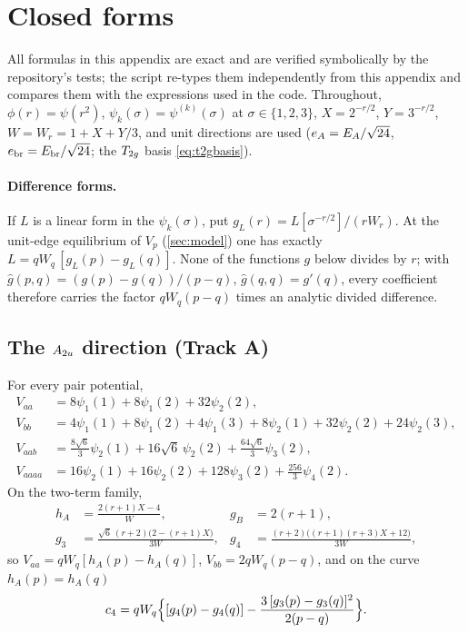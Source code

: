 \section{Closed forms}\label{app:closed}

All formulas in this appendix are exact and are verified symbolically by the repository's tests; the script
 re-types them independently from this appendix and compares them
with the expressions used in the code. Throughout, $\phi(r)=\psi(r^2)$, $\psi_k(\sigma)=\psi^{(k)}(\sigma)$ at
$\sigma\in\{1,2,3\}$, $X=2^{-r/2}$, $Y=3^{-r/2}$, $W=W_r=1+X+Y/3$, and unit directions are used
($e_{A}=E_A/\sqrt{24}$, $e_{\mathrm{br}}=E_{\mathrm{br}}/\sqrt{24}$; the $T_{2g}$ basis \eqref{eq:t2gbasis}).

\paragraph{Difference forms.} If $L$ is a linear form in the $\psi_k(\sigma)$, put $g_L(r)=L[\sigma^{-r/2}]/(rW_r)$.
At the unit-edge equilibrium of $V_p$ (\cref{sec:model}) one has exactly $L=qW_q\,[g_L(p)-g_L(q)]$. None of the
functions $g$ below divides by $r$; with $\hat g(p,q)=(g(p)-g(q))/(p-q)$, $\hat g(q,q)=g'(q)$, every coefficient
therefore carries the factor $qW_q(p-q)$ times an analytic divided difference.

\subsection{The $A_{2u}$ direction (Track A)}
For every pair potential,
\begin{align*}
V_{aa}&=8\psi_1(1)+8\psi_1(2)+32\psi_2(2),\\
V_{bb}&=4\psi_1(1)+8\psi_1(2)+4\psi_1(3)+8\psi_2(1)+32\psi_2(2)+24\psi_2(3),\\
V_{aab}&=\tfrac{8\sqrt6}{3}\psi_2(1)+16\sqrt6\,\psi_2(2)+\tfrac{64\sqrt6}{3}\psi_3(2),\\
V_{aaaa}&=16\psi_2(1)+16\psi_2(2)+128\psi_3(2)+\tfrac{256}{3}\psi_4(2).
\end{align*}
On the two-term family,
\begin{align*}
h_A&=\frac{2(r+1)X-4}{W}, & g_B&=2(r+1),\\
g_3&=\frac{\sqrt6\,(r+2)\bigl(2-(r+1)X\bigr)}{3W}, & g_4&=\frac{(r+2)\bigl((r+1)(r+3)X+12\bigr)}{3W},
\end{align*}
so $V_{aa}=qW_q[h_A(p)-h_A(q)]$, $V_{bb}=2qW_q(p-q)$, and on the curve $h_A(p)=h_A(q)$
\[
c_4=qW_q\Bigl\{[g_4(p)-g_4(q)]-\frac{3\,[g_3(p)-g_3(q)]^2}{2(p-q)}\Bigr\}.
\]

